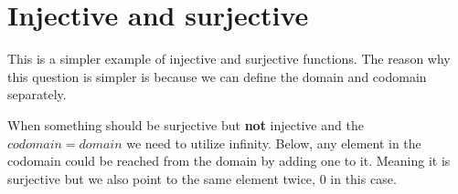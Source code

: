 \documentclass[twocolumn,a4paper]{article}
\begin{document}
\newpage
\section*{Injective and surjective}
This is a simpler example of injective and surjective functions.
The reason why this question is simpler is because we can define the domain and codomain separately.

\begin{figure}[ht]
	\centering
\end{figure}

When something should be surjective but \textbf{not} injective and the \(codomain = domain\) we need to utilize infinity.
Below, any element in the codomain could be reached from the domain by adding one to it.
Meaning it is surjective but we also point to the same element twice, 0 in this case.
\begin{figure}[ht]
	\centering
\end{figure}
\begin{figure}[ht]
	\centering
\end{figure}
\end{document}
